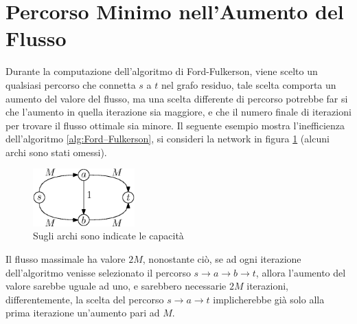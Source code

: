 \documentclass[10pt, letterpaper]{report}
\begin{document}
\section{Percorso Minimo nell'Aumento del Flusso}
Durante la computazione dell'algoritmo di Ford-Fulkerson, viene scelto un qualsiasi percorso che connetta $s$ a $t$ nel grafo residuo, tale scelta comporta un aumento del valore del flusso, ma una scelta differente di percorso potrebbe far si che l'aumento in quella iterazione sia maggiore, e che il numero finale di iterazioni per trovare il flusso ottimale sia minore.
Il seguente esempio mostra l'inefficienza dell'algoritmo \ref{alg:Ford–Fulkerson}, si consideri la  network in figura \ref{network2M} (alcuni archi sono stati omessi).
\begin{figure}[h!]
    \centering 
    \includegraphics[width=0.35\textwidth ]{images/network2M.eps}
    \caption{Sugli archi sono indicate le capacità}
    \label{network2M}
\end{figure}
Il flusso massimale ha valore $2M$, nonostante  ciò, se ad ogni iterazione dell'algoritmo venisse selezionato il percorso $s\rightarrow a \rightarrow b \rightarrow t$, allora l'aumento del valore sarebbe uguale ad uno, e sarebbero necessarie $2M$ iterazioni, differentemente, la scelta del percorso $s\rightarrow a \rightarrow t$ implicherebbe già solo alla prima iterazione un'aumento pari ad $M$.
\end{document}
